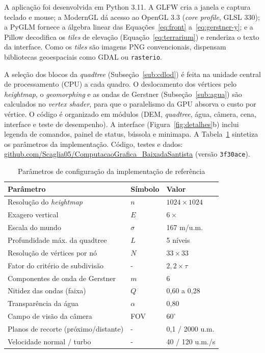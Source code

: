 \documentclass[conference]{IEEEtran}
\newcommand{\fonte}[1]{\par\vspace{2pt}{\footnotesize Fonte: #1\par}}
\begin{document}
A aplicação foi desenvolvida em Python 3.11. A GLFW cria a janela e captura
teclado e mouse; a ModernGL dá acesso ao OpenGL 3.3 (\emph{core profile},
GLSL 330); a PyGLM fornece a álgebra linear das
Equações~\eqref{eq:front} a~\eqref{eq:gerstner-y}; e a Pillow decodifica os
\emph{tiles} de elevação (Equação~\eqref{eq:terrarium}) e renderiza o texto da
interface. Como os \emph{tiles} são imagens PNG convencionais, dispensam
bibliotecas geoespaciais como GDAL ou \texttt{rasterio}.

A seleção dos blocos da \emph{quadtree} (Subseção~\ref{sub:cdlod}) é feita
na unidade central de processamento (CPU) a cada quadro. O deslocamento dos
vértices pelo \emph{heightmap}, o \emph{geomorphing} e as ondas de Gerstner
(Subseção~\ref{sub:agua}) são calculados no \emph{vertex shader}, para que o
paralelismo da GPU absorva o custo por vértice. O código é organizado em
módulos (DEM, \emph{quadtree}, água, câmera, cena, interface e teste de
desempenho). A interface (Figura~\ref{fig:detalhes}b) inclui legenda de comandos, painel de status, bússola e minimapa. A
Tabela~\ref{tab:parametros} sintetiza os parâmetros da implementação. Código, testes e dados: \url{github.com/Scaglia05/ComputacaoGrafica_BaixadaSantista} (versão \texttt{3f30ace}).

\begin{table}[t]
\caption{Parâmetros de configuração da implementação de referência}
\label{tab:parametros}
\centering
\begin{tabular}{@{}p{3.1cm}p{0.9cm}p{2.4cm}@{}}
\toprule
\textbf{Parâmetro} & \textbf{Símbolo} & \textbf{Valor} \\
\midrule
Resolução do \emph{heightmap} & $n$ & $1024 \times 1024$ \\
Exagero vertical & $E$ & $6\times$ \\
Escala do mundo & $\sigma$ & 167 m/u.m. \\
Profundidade máx. da quadtree & $L$ & 5 níveis \\
Resolução de vértices por nó & $N$ & $33 \times 33$ \\
Fator do critério de subdivisão & - & $2{,}2 \times \tau$ \\
Componentes de onda de Gerstner & $m$ & 6 \\
Nitidez das ondas (faixa) & $Q$ & 0,60 a 0,28 \\
Transparência da água & $\alpha$ & 0,80 \\
Campo de visão da câmera & FOV & $60^{\circ}$ \\
Planos de recorte (próximo/distante) & - & 0,1 / 2000 u.m. \\
Velocidade normal / turbo & - & 40 / 120 u.m./s \\
\bottomrule
\end{tabular}
\fonte{Elaborado pelos autores (2026), com base no código-fonte da implementação.}
\end{table}
\end{document}
